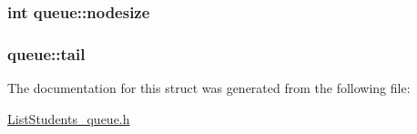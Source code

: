\subsubsection[{\texorpdfstring{nodesize}{nodesize}}]{\setlength{\rightskip}{0pt plus 5cm}int queue\+::nodesize}\hypertarget{structqueue_a652887eeb98c5e87bed0662c2da0e723}{}\label{structqueue_a652887eeb98c5e87bed0662c2da0e723}
\subsubsection[{\texorpdfstring{tail}{tail}}]{ queue\+::tail}\hypertarget{structqueue_a827de955c3490873a13e63e5478b444b}{}\label{structqueue_a827de955c3490873a13e63e5478b444b}


The documentation for this struct was generated from the following file\+:\begin{DoxyCompactItemize}
\item 
\hyperlink{ListStudents__queue_8h}{List\+Students\+\_\+queue.\+h}\end{DoxyCompactItemize}

